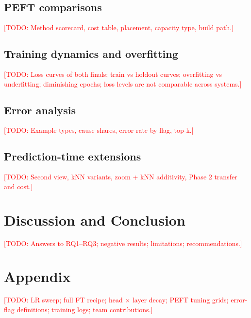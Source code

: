 \documentclass{article} %
\newcommand{\todo}[1]{\textcolor{red}{[TODO: #1]}}
\begin{document}
\subsection{PEFT comparisons}
\todo{Method scorecard, cost table, placement, capacity type, build path.}

\subsection{Training dynamics and overfitting}
\todo{Loss curves of both finals; train vs holdout curves; overfitting vs
underfitting; diminishing epochs; loss levels are not comparable across systems.}

\subsection{Error analysis}
\todo{Example types, cause shares, error rate by flag, top-k.}

\subsection{Prediction-time extensions}
\todo{Second view, kNN variants, zoom + kNN additivity, Phase 2 transfer and cost.}

\section{Discussion and Conclusion}
\label{sec:conclusion}
\todo{Answers to RQ1--RQ3; negative results; limitations; recommendations.}




\appendix
\section{Appendix}
\todo{LR sweep; full FT recipe; head $\times$ layer decay; PEFT tuning grids;
error-flag definitions; training logs; team contributions.}
\end{document}
